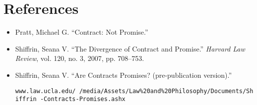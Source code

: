 \section*{References}
{
\small
\begin{itemize}[label={},itemindent=-2em,leftmargin=2em]	
	\item Pratt, Michael G. ``Contract: Not Promise.'' 

	\item Shiffrin, Seana V. ``The Divergence of Contract and Promise.'' \textit{Harvard Law Review}, vol. 120, no. 3, 2007, pp. 708--753.
	
	\item Shiffrin, Seana V. ``Are Contracts Promises? (pre-publication version).'' 
	
	{\footnotesize \texttt{www.law.ucla.edu/~/media/Assets/Law\%20and\%20Philosophy/Documents/Shiffrin -Contracts-Promises.ashx}}
\end{itemize}
}
